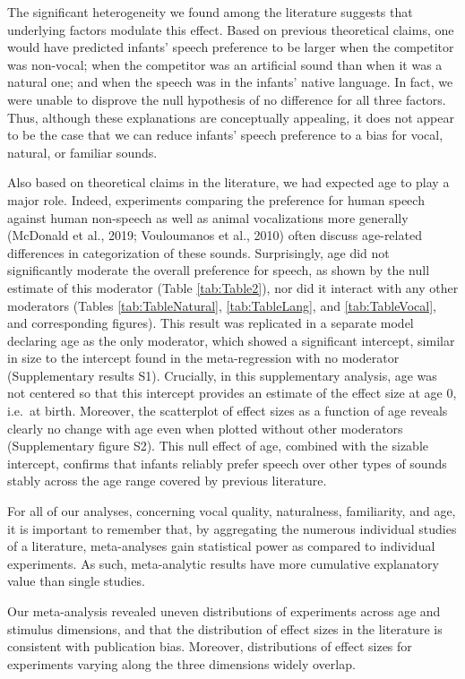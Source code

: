 \documentclass[
  man,mask,floatsintext]{apa6}
\begin{document}
The significant heterogeneity we found among the literature suggests that underlying factors modulate this effect. Based on previous theoretical claims, one would have predicted infants' speech preference to be larger when the competitor was non-vocal; when the competitor was an artificial sound than when it was a natural one; and when the speech was in the infants' native language. In fact, we were unable to disprove the null hypothesis of no difference for all three factors. Thus, although these explanations are conceptually appealing, it does not appear to be the case that we can reduce infants' speech preference to a bias for vocal, natural, or familiar sounds.

Also based on theoretical claims in the literature, we had expected age to play a major role. Indeed, experiments comparing the preference for human speech against human non-speech as well as animal vocalizations more generally (McDonald et al., 2019; Vouloumanos et al., 2010) often discuss age-related differences in categorization of these sounds. Surprisingly, age did not significantly moderate the overall preference for speech, as shown by the null estimate of this moderator (Table \ref{tab:Table2}), nor did it interact with any other moderators (Tables \ref{tab:TableNatural}, \ref{tab:TableLang}, and \ref{tab:TableVocal}, and corresponding figures). This result was replicated in a separate model declaring age as the only moderator, which showed a significant intercept, similar in size to the intercept found in the meta-regression with no moderator (Supplementary results S1).
Crucially, in this supplementary analysis, age was not centered so that this intercept provides an estimate of the effect size at age 0, i.e.~at birth.
Moreover, the scatterplot of effect sizes as a function of age reveals clearly no change with age even when plotted without other moderators (Supplementary figure S2). This null effect of age, combined with the sizable intercept, confirms that infants reliably prefer speech over other types of sounds stably across the age range covered by previous literature.

For all of our analyses, concerning vocal quality, naturalness, familiarity, and age, it is important to remember that, by aggregating the numerous individual studies of a literature, meta-analyses gain statistical power as compared to individual experiments. As such, meta-analytic results have more cumulative explanatory value than single studies.

Our meta-analysis revealed uneven distributions of experiments across age and stimulus dimensions, and that the distribution of effect sizes in the literature is consistent with publication bias. Moreover, distributions of effect sizes for experiments varying along the three dimensions widely overlap.
\end{document}
